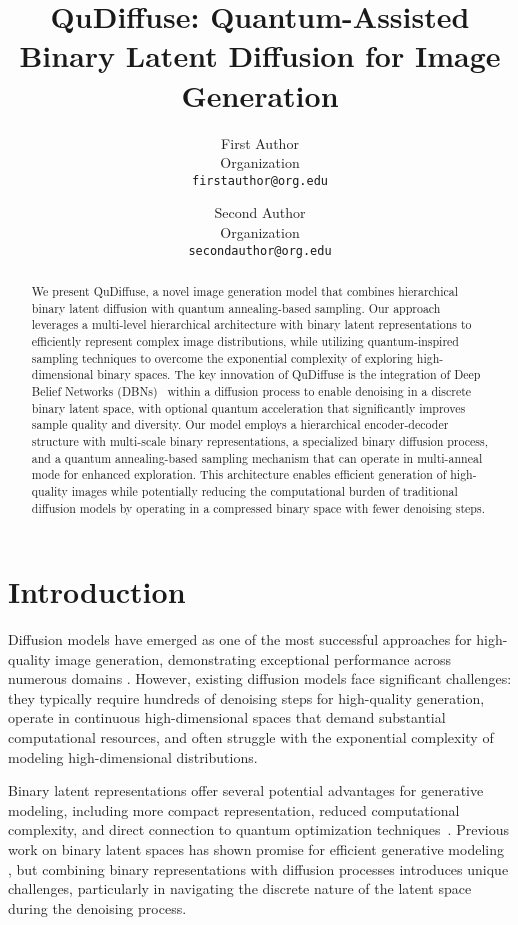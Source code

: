 \documentclass[10pt,twocolumn,letterpaper]{article}
\title{QuDiffuse: Quantum-Assisted Binary Latent Diffusion for Image Generation}
\author{First Author\\
Organization\\
{\tt\small firstauthor@org.edu}
\and
Second Author\\
Organization\\
{\tt\small secondauthor@org.edu}
}
\begin{document}
\maketitle

\begin{abstract}
We present QuDiffuse, a novel image generation model that combines hierarchical binary latent diffusion with quantum annealing-based sampling. Our approach leverages a multi-level hierarchical architecture with binary latent representations to efficiently represent complex image distributions, while utilizing quantum-inspired sampling techniques to overcome the exponential complexity of exploring high-dimensional binary spaces. The key innovation of QuDiffuse is the integration of Deep Belief Networks (DBNs)~\cite{hinton2006fast, hinton2009dbn} within a diffusion process to enable denoising in a discrete binary latent space, with optional quantum acceleration that significantly improves sample quality and diversity. Our model employs a hierarchical encoder-decoder structure with multi-scale binary representations, a specialized binary diffusion process, and a quantum annealing-based sampling mechanism that can operate in multi-anneal mode for enhanced exploration. This architecture enables efficient generation of high-quality images while potentially reducing the computational burden of traditional diffusion models by operating in a compressed binary space with fewer denoising steps.
\end{abstract}

\section{Introduction}
Diffusion models have emerged as one of the most successful approaches for high-quality image generation, demonstrating exceptional performance across numerous domains \cite{ddpm, ddim, latent}. However, existing diffusion models face significant challenges: they typically require hundreds of denoising steps for high-quality generation, operate in continuous high-dimensional spaces that demand substantial computational resources, and often struggle with the exponential complexity of modeling high-dimensional distributions.

Binary latent representations offer several potential advantages for generative modeling, including more compact representation, reduced computational complexity, and direct connection to quantum optimization techniques~\cite{courbariaux2016binarized}. Previous work on binary latent spaces has shown promise for efficient generative modeling \cite{vqvae, vqgan, vae}, but combining binary representations with diffusion processes introduces unique challenges, particularly in navigating the discrete nature of the latent space during the denoising process.
\end{document}
